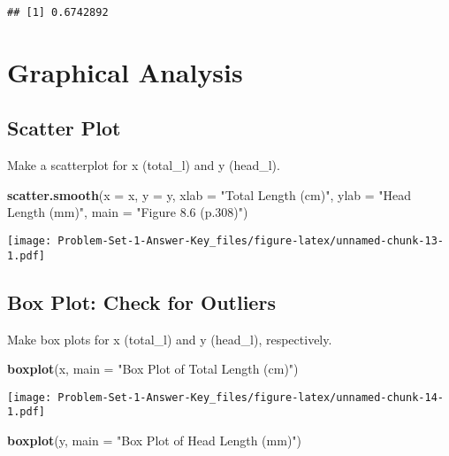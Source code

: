 \documentclass[
]{book}
\newenvironment{Shaded}{\begin{snugshade}}{\end{snugshade}}
\newcommand{\DataTypeTok}[1]{\textcolor[rgb]{0.13,0.29,0.53}{#1}}
\newcommand{\KeywordTok}[1]{\textcolor[rgb]{0.13,0.29,0.53}{\textbf{#1}}}
\newcommand{\NormalTok}[1]{#1}
\newcommand{\StringTok}[1]{\textcolor[rgb]{0.31,0.60,0.02}{#1}}
\begin{document}
\begin{verbatim}
## [1] 0.6742892
\end{verbatim}

\hypertarget{graphical-analysis}{%
\section{Graphical Analysis}\label{graphical-analysis}}

\hypertarget{scatter-plot}{%
\subsection{Scatter Plot}\label{scatter-plot}}

Make a scatterplot for x (total\_l) and y (head\_l).

\begin{Shaded}
\begin{Highlighting}[]
\KeywordTok{scatter.smooth}\NormalTok{(}\DataTypeTok{x =}\NormalTok{ x, }\DataTypeTok{y =}\NormalTok{ y, }
               \DataTypeTok{xlab =} \StringTok{"Total Length (cm)"}\NormalTok{, }
               \DataTypeTok{ylab =} \StringTok{"Head Length (mm)"}\NormalTok{, }
               \DataTypeTok{main =} \StringTok{"Figure 8.6 (p.308)"}\NormalTok{) }
\end{Highlighting}
\end{Shaded}

\texttt{[image: Problem-Set-1-Answer-Key\_files/figure-latex/unnamed-chunk-13-1.pdf]}

\hypertarget{box-plot-check-for-outliers}{%
\subsection{Box Plot: Check for Outliers}\label{box-plot-check-for-outliers}}

Make box plots for x (total\_l) and y (head\_l), respectively.

\begin{Shaded}
\begin{Highlighting}[]
\KeywordTok{boxplot}\NormalTok{(x, }\DataTypeTok{main =} \StringTok{"Box Plot of Total Length (cm)"}\NormalTok{)}
\end{Highlighting}
\end{Shaded}

\texttt{[image: Problem-Set-1-Answer-Key\_files/figure-latex/unnamed-chunk-14-1.pdf]}

\begin{Shaded}
\begin{Highlighting}[]
\KeywordTok{boxplot}\NormalTok{(y, }\DataTypeTok{main =} \StringTok{"Box Plot of Head Length (mm)"}\NormalTok{)}
\end{Highlighting}
\end{Shaded}
\end{document}
